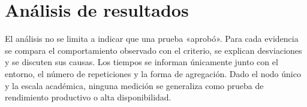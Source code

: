 \section{Análisis de resultados}

El análisis no se limita a indicar que una prueba «aprobó». Para cada evidencia se compara el comportamiento observado con el criterio, se explican desviaciones y se discuten sus causas. Los tiempos se informan únicamente junto con el entorno, el número de repeticiones y la forma de agregación. Dado el nodo único y la escala académica, ninguna medición se generaliza como prueba de rendimiento productivo o alta disponibilidad.

